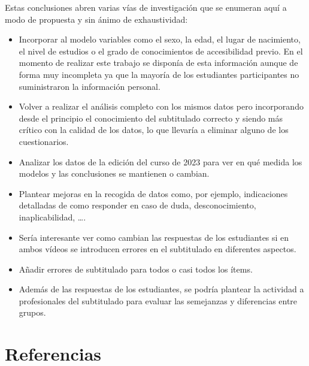 \documentclass[
  12pt,
  a4paper,
  extrafontsizes,
  onecolumn,
  openright,
  table]{memoir}
\providecommand{\tightlist}{%
  \setlength{\itemsep}{0pt}\setlength{\parskip}{0pt}}\usepackage{longtable,booktabs,array}
\begin{document}
Estas conclusiones abren varias vías de investigación que se enumeran
aquí a modo de propuesta y sin ánimo de exhaustividad:

\begin{itemize}
\tightlist
\item
  Incorporar al modelo variables como el sexo, la edad, el lugar de
  nacimiento, el nivel de estudios o el grado de conocimientos de
  accesibilidad previo. En el momento de realizar este trabajo se
  disponía de esta información aunque de forma muy incompleta ya que la
  mayoría de los estudiantes participantes no suministraron la
  información personal.
\item
  Volver a realizar el análisis completo con los mismos datos pero
  incorporando desde el principio el conocimiento del subtitulado
  correcto y siendo más crítico con la calidad de los datos, lo que
  llevaría a eliminar alguno de los cuestionarios.
\item
  Analizar los datos de la edición del curso de 2023 para ver en qué
  medida los modelos y las conclusiones se mantienen o cambian.
\item
  Plantear mejoras en la recogida de datos como, por ejemplo,
  indicaciones detalladas de como responder en caso de duda,
  desconocimiento, inaplicabilidad, \ldots.
\item
  Sería interesante ver como cambian las respuestas de los estudiantes
  si en ambos vídeos se introducen errores en el subtitulado en
  diferentes aspectos.
\item
  Añadir errores de subtitulado para todos o casi todos los ítems.
\item
  Además de las respuestas de los estudiantes, se podría plantear la
  actividad a profesionales del subtitulado para evaluar las semejanzas
  y diferencias entre grupos.
\end{itemize}


\hypertarget{referencias}{%
\chapter*{Referencias}\label{referencias}}


\printbibliography[heading=none]

\cleardoublepage
{}
{}
\appendix
\end{document}
